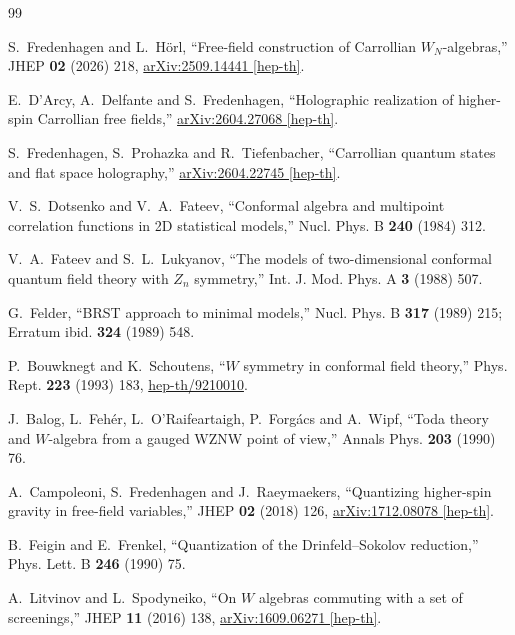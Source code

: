 \documentclass[11pt,a4paper]{article}
\numberwithin{equation}{section}
\theoremstyle{remark}
\begin{document}
\begin{thebibliography}{99}

S.~Fredenhagen and L.~H\"orl,
``Free-field construction of Carrollian $W_N$-algebras,''
JHEP \textbf{02} (2026) 218,
\href{https://arxiv.org/abs/2509.14441}{arXiv:2509.14441 [hep-th]}.

E.~D'Arcy, A.~Delfante and S.~Fredenhagen,
``Holographic realization of higher-spin Carrollian free fields,''
\href{https://arxiv.org/abs/2604.27068}{arXiv:2604.27068 [hep-th]}.

S.~Fredenhagen, S.~Prohazka and R.~Tiefenbacher,
``Carrollian quantum states and flat space holography,''
\href{https://arxiv.org/abs/2604.22745}{arXiv:2604.22745 [hep-th]}.

V.~S.~Dotsenko and V.~A.~Fateev,
``Conformal algebra and multipoint correlation functions in 2D statistical models,''
Nucl. Phys. B \textbf{240} (1984) 312.

V.~A.~Fateev and S.~L.~Lukyanov,
``The models of two-dimensional conformal quantum field theory with $Z_n$ symmetry,''
Int. J. Mod. Phys. A \textbf{3} (1988) 507.

G.~Felder,
``BRST approach to minimal models,''
Nucl. Phys. B \textbf{317} (1989) 215;
Erratum ibid. \textbf{324} (1989) 548.

P.~Bouwknegt and K.~Schoutens,
``$W$ symmetry in conformal field theory,''
Phys. Rept. \textbf{223} (1993) 183,
\href{https://arxiv.org/abs/hep-th/9210010}{hep-th/9210010}.

J.~Balog, L.~Feh\'er, L.~O'Raifeartaigh, P.~Forg\'acs and A.~Wipf,
``Toda theory and $W$-algebra from a gauged WZNW point of view,''
Annals Phys. \textbf{203} (1990) 76.

A.~Campoleoni, S.~Fredenhagen and J.~Raeymaekers,
``Quantizing higher-spin gravity in free-field variables,''
JHEP \textbf{02} (2018) 126,
\href{https://arxiv.org/abs/1712.08078}{arXiv:1712.08078 [hep-th]}.

B.~Feigin and E.~Frenkel,
``Quantization of the Drinfeld--Sokolov reduction,''
Phys. Lett. B \textbf{246} (1990) 75.

A.~Litvinov and L.~Spodyneiko,
``On $W$ algebras commuting with a set of screenings,''
JHEP \textbf{11} (2016) 138,
\href{https://arxiv.org/abs/1609.06271}{arXiv:1609.06271 [hep-th]}.


\end{thebibliography}
\end{document}
